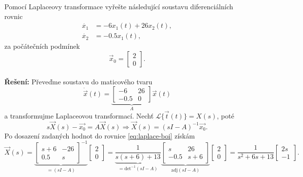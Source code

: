 \documentclass[twoside]{article}
\begin{document}
\subsection{~}
Pomocí Laplaceovy transformace vyřešte následující soustavu diferenciálních rovnic
\begin{equation*}
	\begin{split}
		\dot{x_1} &= - 6x_1 (t) + 26x_2 (t), \\
		\dot{x_2} &= - 0.5 x_1(t),
	\end{split}
\end{equation*}
za počátečních podmínek
\begin{equation*}
	\vec{x}_0 = \begin{bmatrix}
		2 \\
		0
	  \end{bmatrix}.
\end{equation*} \\
\textbf{Řešení:} Převeďme soustavu do maticového tvaru
\begin{equation*}
	\dot{\vec{x}}(t) = \underbrace{\begin{bmatrix}
		-6 & 26 \\
		-0.5 & 0
	\end{bmatrix}}_{A} \vec{x}(t)
\end{equation*}
a transformujme Laplaceovou transformací. Nechť $\mathcal{L}\{\vec{t}(t)\} = X(s)$, poté
\begin{equation}
	\label{eq:laplace-boi}
	s\vec{X}(s) - \vec{x_0} = A\vec{X}(s) \Rightarrow \vec{X}(s) = (sI-A)^{-1}\vec{x_0}.
\end{equation}
Po dosazení zadaných hodnot do rovnice \eqref{eq:laplace-boi} získám
\begin{equation*}
	\vec{X}(s) = \underbrace{\begin{bmatrix}
		s + 6 & -26 \\
		0.5 & s
	\end{bmatrix}^{-1}}_{=(sI - A)} \begin{bmatrix}
		2 \\
		0
	\end{bmatrix} = \underbrace{\frac{1}{s(s+6) + 13}}_{=\text{det}^{-1}(sI - A)} \underbrace{\begin{bmatrix}
		s & 26 \\
		-0.5 & s + 6
	\end{bmatrix}}_{\text{adj}(sI - A)} \begin{bmatrix}
		2 \\
		0
	\end{bmatrix} = \frac{1}{s^2 + 6s + 13} \begin{bmatrix}
		2s \\
		-1
	\end{bmatrix}.
\end{equation*}
\end{document}
